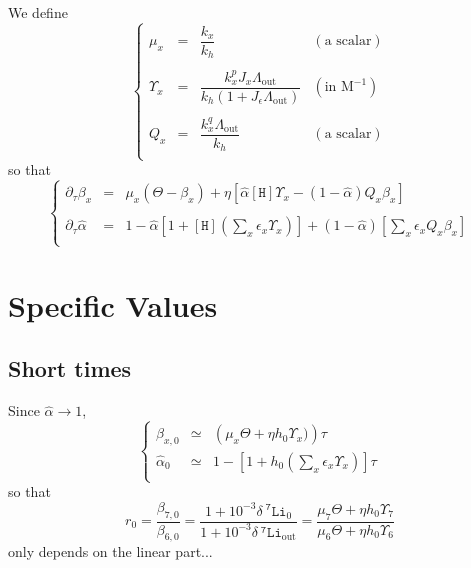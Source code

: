 \documentclass[aps,onecolumn,10pt]{revtex4}
\newcommand{\mychem}[1]{\mathtt{#1}}
\newcommand{\myconc}[1]{\left\lbrack{#1}\right\rbrack}
\newcommand{\spLi}[1]{{~^{\mychem{#1}}\mychem{Li}}}
\newcommand{\spproton}{\mychem{H}}
\newcommand{\proton}{\myconc{\spproton}}
\newcommand{\deltaLi}{ {\delta\!\!\!\spLi{7}} }
\newcommand{\deltaLiOut}{{\deltaLi}_{\mathrm{out}}}
\newcommand{\LiAll}{\Lambda}
\newcommand{\LiAllOut}{{\LiAll}_{\mathrm{out}}}
\begin{document}
We define 
\begin{equation}
\left\lbrace
\begin{array}{rcll}
	\mu_x      & = & \dfrac{k_x}{k_h} & (\text{a scalar})\\
	\\
	\Upsilon_x & = & \dfrac{k_x^pJ_x \LiAllOut}{k_h\left(1+ J_\epsilon\LiAllOut\right)} & (\text{in M}^{-1})
	 \\
	 \\
	Q_x & = & \dfrac{k_x^q \LiAllOut}{k_h} & (\text{a scalar})\\
\end{array}
\right.
\end{equation}
so that
\begin{equation}
\left\lbrace
\begin{array}{rcl}
\partial_\tau \beta_x  & = &  \mu_x \left(\Theta -\beta_x \right) + \eta \left[ \hat\alpha \proton \Upsilon_x  -  \left(1-\hat\alpha\right) Q_x\beta_x \right] \\
\\
	\partial_\tau \hat\alpha & = & 1 - 
		\hat\alpha \left\lbrack 1+ \proton \left(\sum_x \epsilon_x \Upsilon_x \right)\right] + (1-\hat\alpha) \left\lbrack {\sum_x  \epsilon_x Q_x \beta_x }  \right\rbrack \\
\end{array}
\right.
\end{equation}

\section{Specific Values}
\subsection{Short times}
Since $\hat\alpha\to1$,
\begin{equation}
\left\lbrace
\begin{array}{rcl}
\beta_{x,0} & \simeq & \left(\mu_x \Theta + \eta h_0 \Upsilon_x)\right)\tau\\
\hat\alpha_{0} & \simeq & 1 - \left[1+h_0 \left(\sum_x \epsilon_x \Upsilon_x\right)\right] \tau\\
\end{array}
\right.
\end{equation}
so that
\begin{equation}
	r_0 = \dfrac{\beta_{7,0}}{\beta_{6,0}} = \dfrac{1+10^{-3}\deltaLi_0}{1+10^{-3}\deltaLiOut}
	 = \dfrac{\mu_7\Theta+\eta h_0 \Upsilon_7}{\mu_6\Theta+\eta h_0 \Upsilon_6}
\end{equation}
only depends on the linear part...
\end{document}
